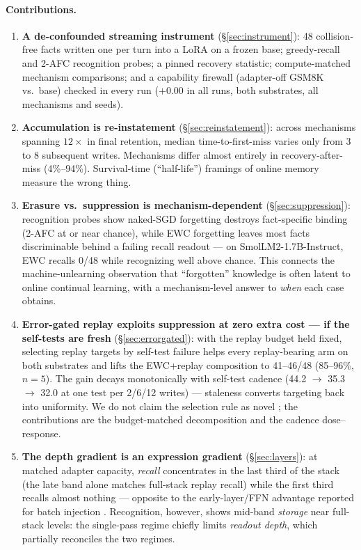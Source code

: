 \documentclass[11pt]{article}
\newcommand{\smol}{SmolLM2-1.7B-Instruct}
\begin{document}
\paragraph{Contributions.}
\begin{enumerate}
\item \textbf{A de-confounded streaming instrument} (\S\ref{sec:instrument}): 48 collision-free facts
written one per turn into a LoRA on a frozen base; greedy-recall and 2-AFC recognition probes; a
pinned recovery statistic; compute-matched mechanism comparisons; and a capability firewall
(adapter-off GSM8K vs.\ base) checked in every run ($+0.00$ in all runs, both substrates, all
mechanisms and seeds).
\item \textbf{Accumulation is re-instatement} (\S\ref{sec:reinstatement}): across mechanisms spanning
$12\times$ in final retention, median time-to-first-miss varies only from 3 to 8 subsequent writes.
Mechanisms differ almost entirely in recovery-after-miss (4\%--94\%). Survival-time (``half-life'')
framings of online memory measure the wrong thing.
\item \textbf{Erasure vs.\ suppression is mechanism-dependent} (\S\ref{sec:suppression}): recognition
probes show naked-SGD forgetting destroys fact-specific binding (2-AFC at or near chance), while EWC
forgetting leaves most facts discriminable behind a failing recall readout --- on \smol{}, EWC recalls
0/48 while recognizing well above chance. This connects the machine-unlearning observation that
``forgotten'' knowledge is often latent \citep{unlearning-deletion,quantization-unlearning,kotha2023}
to online continual learning, with a mechanism-level answer to \emph{when} each case obtains.
\item \textbf{Error-gated replay exploits suppression at zero extra cost --- if the self-tests are
fresh} (\S\ref{sec:errorgated}): with the replay budget held fixed, selecting replay targets by
self-test failure helps every replay-bearing arm on both substrates and lifts the EWC+replay
composition to 41--46/48 (85--96\%, $n{=}5$). The gain decays monotonically with self-test cadence
(44.2 $\to$ 35.3 $\to$ 32.0 at one test per 2/6/12 writes) --- staleness converts targeting back into
uniformity. We do not claim the selection rule as novel \citep{aljundi2019mir,sure2025,mssr2026}; the
contributions are the budget-matched decomposition and the cadence dose--response.
\item \textbf{The depth gradient is an expression gradient} (\S\ref{sec:layers}): at matched adapter
capacity, \emph{recall} concentrates in the last third of the stack (the late band alone matches
full-stack replay recall) while the first third recalls almost nothing --- opposite to the
early-layer/FFN advantage reported for batch injection \citep{back2026lora}. Recognition, however,
shows mid-band \emph{storage} near full-stack levels: the single-pass regime chiefly limits
\emph{readout depth}, which partially reconciles the two regimes.
\end{enumerate}
\end{document}

